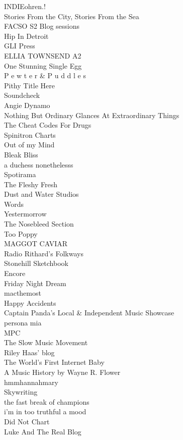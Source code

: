 \documentclass[10pt,letterpaper]{article}
\begin{document}
INDIEohren.!\\
Stories From the City, Stories From the Sea\\
FACSO S2 Blog sessions\\
Hip In Detroit\\
GLI Press\\
ELLIA TOWNSEND A2\\
One Stunning Single Egg\\
P e w t e r \& P u d d l e s\\
Pithy Title Here\\
Soundcheck\\
Angie Dynamo\\
Nothing But Ordinary Glances At Extraordinary Things\\
The Cheat Codes For Drugs\\
Spinitron Charts\\
Out of my Mind\\
Bleak Bliss\\
a duchess nonethelesss\\
Spotirama\\
The Fleshy Fresh\\
Dust and Water Studios\\
Words\\
Yestermorrow\\
The Nosebleed Section\\
Too Poppy\\
MAGGOT CAVIAR\\
Radio Rithard's Folkways\\
Stonehill Sketchbook\\
Encore\\
Friday Night Dream\\
macthemost\\
Happy Accidents\\
Captain Panda's Local \& Independent Music Showcase\\
persona mia\\
MPC\\
The Slow Music Movement\\
Riley Haas' blog\\
The World's First Internet Baby\\
A Music History by Wayne R. Flower\\
hmmhannahmary\\
Skywriting\\
the fast break of champions\\
i'm in too truthful a mood\\
Did Not Chart\\
Luke And The Real Blog\\
\\
\end{document}
